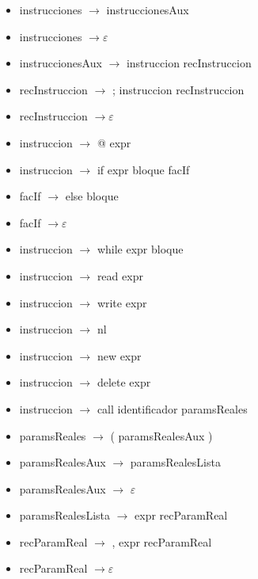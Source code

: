 \documentclass[11pt]{article}
\begin{document}
        \begin{itemize}
            \item instrucciones $\rightarrow$ instruccionesAux
            \item instrucciones $\rightarrow \varepsilon$
            \item instruccionesAux $\rightarrow$ instruccion recInstruccion
            \item recInstruccion $\rightarrow$ ; instruccion recInstruccion
            \item recInstruccion $\rightarrow \varepsilon$
            \item instruccion $\rightarrow$ @ expr
            \item instruccion $\rightarrow$ if expr bloque facIf
            \item facIf $\rightarrow$ else bloque
            \item facIf $\rightarrow \varepsilon$
            \item instruccion $\rightarrow$ while expr bloque
            \item instruccion $\rightarrow$ read expr
            \item instruccion $\rightarrow$ write expr 
            \item instruccion $\rightarrow$ nl
            \item instruccion $\rightarrow$ new expr
            \item instruccion $\rightarrow$ delete expr
            \item instruccion $\rightarrow$ call identificador paramsReales
            \item paramsReales $\rightarrow$ ( paramsRealesAux )
            \item paramsRealesAux $\rightarrow$ paramsRealesLista
            \item paramsRealesAux $\rightarrow$ $\varepsilon$
            \item paramsRealesLista $\rightarrow$ expr recParamReal
            \item recParamReal $\rightarrow$ , expr recParamReal
            \item recParamReal $\rightarrow \varepsilon$
        \end{itemize}
        \
\end{document}
